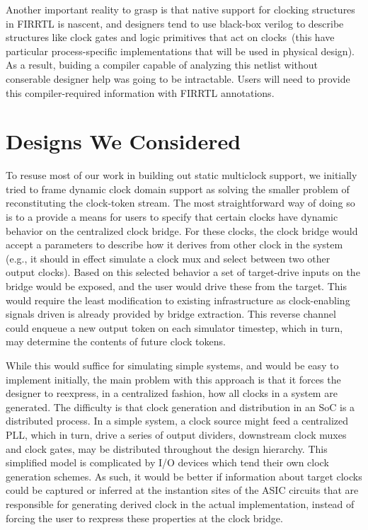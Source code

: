 Another important reality to grasp is that native support for clocking
structures in FIRRTL is nascent, and designers tend to use black-box verilog to
describe structures like clock gates and logic primitives that act on
clocks~(this have particular process-specific implementations that will be used
in physical design). As a result, buiding a compiler capable of analyzing this
netlist without conserable designer help was going to be intractable. Users will
need to provide this compiler-required information with FIRRTL annotations.

\section{Designs We Considered}


To resuse most of our work in building out static multiclock support, we
initially tried to frame dynamic clock domain support as solving the smaller
problem of reconstituting the clock-token stream. The most straightforward way
of doing so is to a provide a means for users to specify that certain clocks
have dynamic behavior on the centralized clock bridge. For these clocks, the
clock bridge would accept a parameters to describe how it derives from other
clock in the system (e.g., it should in effect simulate a clock mux and select
between two other output clocks). Based on this selected behavior a set of
target-drive inputs on the bridge would be exposed, and the user would drive
these from the target. This would require the least modification to existing
infrastructure as clock-enabling signals driven is already provided by bridge
extraction. This reverse channel could enqueue a new output token on each
simulator timestep, which in turn, may determine the contents of future clock
tokens.

While this would suffice for simulating simple systems, and would be easy to
implement initially, the main problem with this approach is that it forces the
designer to reexpress, in a centralized fashion, how all clocks in a system are
generated. The difficulty is that clock generation and distribution in an SoC
is a distributed process.  In a simple system, a clock source might feed a centralized PLL,
which in turn, drive a series of output dividers, downstream clock muxes and
clock gates, may be distributed throughout the design hierarchy. This simplified model is complicated by I/O
devices which tend their own clock generation schemes. As such, it would be
better if information about target clocks could be captured or inferred at the instantion
sites of the ASIC circuits that are responsible for generating derived clock in
the actual implementation, instead of forcing the user to rexpress these
properties at the clock bridge.

